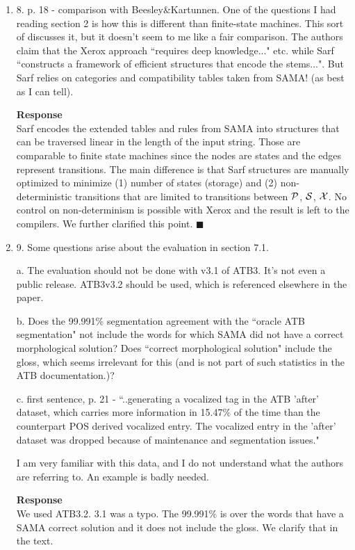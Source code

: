 \begin{enumerate}[leftmargin=0mm,label=\bfseries CommentR3.\arabic*]
\item \label{Review.3.15}
8. p. 18 - comparison with Beesley\&Kartunnen.  One of the questions I had reading section 2 is how this is different than finite-state machines. This sort of discusses it, but it doesn't seem to me like a fair comparison.   The authors claim that the Xerox approach ``requires deep knowledge..." etc. while Sarf ``constructs a framework of efficient
structures that encode the stems...".   
But Sarf relies on categories and compatibility tables taken from SAMA! (as best as I can tell).

\textbf{Response}\\
Sarf encodes the extended tables and rules from SAMA into structures that can be traversed linear in the length of the input string.
Those are comparable to finite state machines since the nodes are states and the edges represent transitions. 
The main difference is that Sarf structures are manually optimized to minimize (1) number of states (storage) and (2) non-deterministic transitions that are limited to transitions between ${\cal P}$, ${\cal S}$, ${\cal X}$.
No control on non-determinism is possible with Xerox and the result is left to the compilers. 
We further clarified this point. 
$\blacksquare$
\item \label{Review.3.16}
9. Some questions arise about the evaluation in section 7.1.

a. The evaluation should not be done with v3.1 of ATB3.  It's not even a public release. ATB3v3.2 should be used, which is referenced elsewhere in the paper.

b. Does the 99.991\% segmentation agreement with the ``oracle ATB segmentation" not include the words for which SAMA did not have a correct morphological solution?  Does ``correct morphological solution" include the gloss, which
seems irrelevant for this (and is not part of such statistics in the  ATB documentation.)?

c. first sentence, p. 21 - ``..generating a vocalized tag in the ATB 'after' dataset, which carries more information in 15.47\% of the time than the counterpart POS derived vocalized entry. The vocalized entry in the 'after' dataset was dropped because of maintenance and segmentation issues."

I am very familiar with this data, and I do not understand what the authors are referring to.  An example is badly needed.

\textbf{Response}\\
We used ATB3.2. 3.1 was a typo.  The 99.991\% is over the words that have a SAMA correct solution and it does not include the gloss. We clarify that in the text.


\end{enumerate}
